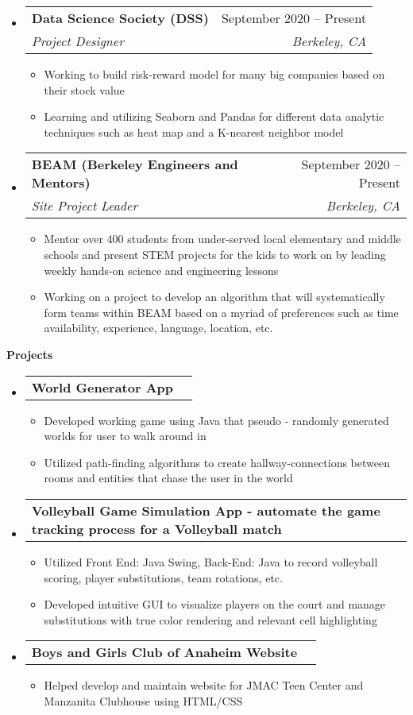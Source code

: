 \documentclass[letterpaper,8pt]{article}[leftmargin=*]
\makeatletter
\def \entryspacing {-0pt}
\renewcommand{\section}[2]{\vspace{5pt}
  \colorbox{secondary}{\color{white}\raggedbottom\normalsize\textbf{{#1}{\hspace{7pt}#2}}}
}
\newcommand{\resumeEntryStart}{\begin{itemize}[leftmargin=2.5mm]}
\newcommand{\resumeEntryEnd}{\end{itemize}\vspace{\entryspacing}}
\newcommand{\resumeItemListStart}{\begin{itemize}[leftmargin=4.5mm]}
\newcommand{\resumeItemListEnd}{\end{itemize}}
\newcommand{\resumeItem}[1]{
  \item\small{
    {#1 \vspace{-2pt}}
  }
}
\newcommand{\resumeEntryTSDL}[4]{
  \vspace{-1pt}\item[]
    \begin{tabularx}{0.97\textwidth}{X@{\hspace{60pt}}r}
      \textbf{\color{primary}#1} & {\firabook\color{accent}\small#2} \\
      \textit{\color{accent}\small#3} & \textit{\color{accent}\small#4} \\
    \end{tabularx}\vspace{-6pt}
}
\newcommand{\resumeEntryTD}[2]{
  \vspace{-1pt}\item[]
    \begin{tabularx}{0.97\textwidth}{X@{\hspace{60pt}}r}
      \textbf{\color{primary}#1} & {\firabook\color{accent}\small#2} \\
    \end{tabularx}\vspace{-6pt}
}
\makeatother
\begin{document}
  \resumeEntryStart
    \resumeEntryTSDL
      {Data Science Society (DSS)}{September 2020 -- Present}
      {Project Designer}{Berkeley, CA}
    \resumeItemListStart
      \resumeItem {Working to build risk-reward model for many big companies based on their stock value}
      \resumeItem {Learning and utilizing Seaborn and Pandas for different data analytic techniques such as heat map and a K-nearest neighbor model}
    \resumeItemListEnd
  \resumeEntryEnd
  
  \resumeEntryStart
    \resumeEntryTSDL
      {BEAM (Berkeley Engineers and Mentors)}{September 2020 -- Present}
      {Site Project Leader}{Berkeley, CA}
    \resumeItemListStart
      \resumeItem {Mentor over 400 students from under-served local elementary and middle schools and present STEM projects for the kids to work on by leading weekly hands-on science and engineering lessons}
      \resumeItem {Working on a project to develop an algorithm that will systematically form teams within BEAM based on a myriad of preferences such as time availability, experience, language, location, etc.}
    \resumeItemListEnd
  \resumeEntryEnd



\section{\faFlask}{Projects}

  \resumeEntryStart
    \resumeEntryTD
      {World Generator App}{}
    \resumeItemListStart
      \resumeItem {Developed working game using Java that pseudo - randomly generated worlds for user to walk around in}
      \resumeItem {Utilized path-finding algorithms to create hallway-connections between rooms and entities that chase the user in the world}
    \resumeItemListEnd
  \resumeEntryEnd

  \resumeEntryStart
    \resumeEntryTD
      {Volleyball Game Simulation App - automate the game tracking process for a Volleyball match}{}
    \resumeItemListStart
      \resumeItem {Utilized Front End: Java Swing, Back-End: Java to record volleyball scoring, player substitutions, team rotations, etc.}
      \resumeItem {Developed intuitive GUI to visualize players on the court and manage substitutions with true color rendering and relevant cell highlighting}
    \resumeItemListEnd
  \resumeEntryEnd

  \resumeEntryStart
    \resumeEntryTD
      {Boys and Girls Club of Anaheim Website}{}
    \resumeItemListStart
      \resumeItem {Helped develop and maintain website for JMAC Teen Center and Manzanita Clubhouse using HTML/CSS}
    \resumeItemListEnd
  \resumeEntryEnd
\end{document}
